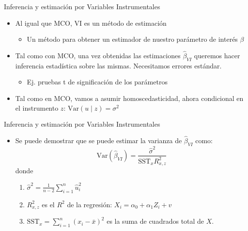 \documentclass[10pt]{beamer}
\begin{document}
\begin{frame}{Inferencia y estimación por Variables Instrumentales}
\begin{itemize}
    \item Al igual que MCO, VI es un método de estimación
    \begin{itemize}
        \item Un método para obtener un estimador de nuestro parámetro de interés $\beta$
    \end{itemize}
    \item Tal como con MCO, una vez obtenidas las estimaciones \(\hat{\beta}_{VI}\) queremos hacer inferencia estadística sobre las mismas. Necesitamos errores estándar.
    \begin{itemize}
        \item Ej. pruebas t de significación de los parámetros
    \end{itemize}
    \item Tal como en MCO, vamos a asumir homoscedasticidad, ahora condicional en el instrumento \(z\): \( \text{Var}(u \mid z) = \sigma^2 \)
\end{itemize}
\end{frame}
\begin{frame}{Inferencia y estimación por Variables Instrumentales}
\begin{itemize}
    \item Se puede demostrar que se puede estimar la varianza de \(\hat{\beta}_{VI}\) como:
    \[
    \text{Var}(\hat{\beta}_{VI}) = \frac{\hat{\sigma}^2}{\text{SST}_x R^2_{x,z}}
    \]
    donde
    \begin{enumerate}
        \item \(\hat{\sigma}^2 = \frac{1}{n-2} \sum_{i=1}^{n} \hat{u}_i^2\)
        \item \(R^2_{x,z}\) es el \(R^2\) de la regresión: \(X_i = \alpha_0 + \alpha_1 Z_i + v\)
        \item \(\text{SST}_x = \sum_{i=1}^{n} (x_i - \bar{x})^2\) es la suma de cuadrados total de \(X\).
    \end{enumerate}
\end{itemize}
\end{frame}
\end{document}

